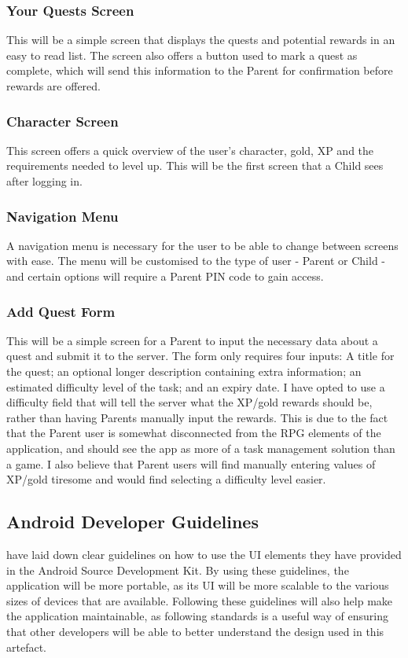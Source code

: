 \subsubsection{Your Quests Screen}
This will be a simple screen that displays the quests and potential rewards in an easy to read list.
The screen also offers a button used to mark a quest as complete, which will send this information to the Parent for confirmation before rewards are offered.

\subsubsection{Character Screen}
This screen offers a quick overview of the user's character, gold, XP and the requirements needed to level up.
This will be the first screen that a Child sees after logging in.

\subsubsection{Navigation Menu}
A navigation menu is necessary for the user to be able to change between screens with ease.
The menu will be customised to the type of user - Parent or Child - and certain options will require a Parent PIN code to gain access. 

\subsubsection{Add Quest Form}
This will be a simple screen for a Parent to input the necessary data about a quest and submit it to the server. 
The form only requires four inputs: A title for the quest; an optional longer description containing extra information; an estimated difficulty level of the task; and an expiry date.
I have opted to use a difficulty field that will tell the server what the XP/gold rewards should be, rather than having Parents manually input the rewards.
This is due to the fact that the Parent user is somewhat disconnected from the RPG elements of the application, and should see the app as more of a task management solution than a game.
I also believe that Parent users will find manually entering values of XP/gold tiresome and would find selecting a difficulty level easier. 

\subsection{Android Developer Guidelines}
\cite{materialdesignguidelines} have laid down clear guidelines on how to use the UI elements they have provided in the Android Source Development Kit.
By using these guidelines, the application will be more portable, as its UI will be more scalable to the various sizes of devices that are available.%
Following these guidelines will also help make the application maintainable, as following standards is a useful way of ensuring that other developers will be able to better understand the design used in this artefact.
